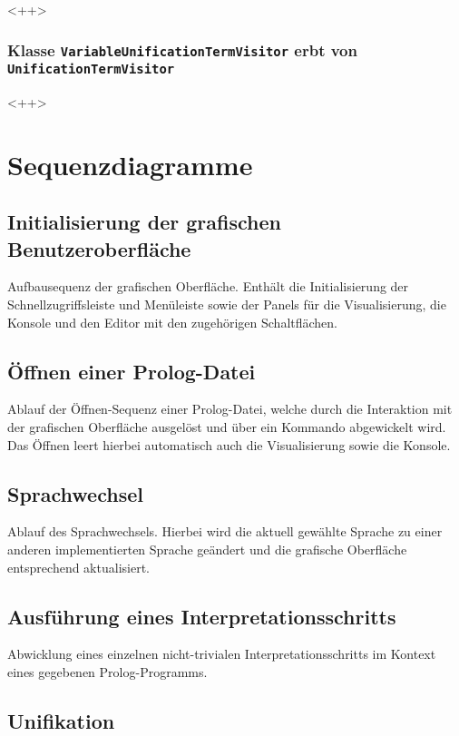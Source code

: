 \documentclass[parskip=full,11pt,twoside]{scrartcl}
\begin{document}
<++>

\subsubsection{Klasse \texttt{VariableUnificationTermVisitor} erbt von \texttt{UnificationTermVisitor}}

<++>

\section{Sequenzdiagramme}

\subsection{Initialisierung der grafischen Benutzeroberfläche}

Aufbausequenz der grafischen Oberfläche. Enthält die Initialisierung der Schnellzugriffsleiste und Menüleiste sowie der Panels für die Visualisierung, die Konsole und den Editor mit den zugehörigen Schaltflächen.

\subsection{Öffnen einer Prolog-Datei}

Ablauf der Öffnen-Sequenz einer Prolog-Datei, welche durch die Interaktion mit der grafischen Oberfläche ausgelöst und über ein Kommando abgewickelt wird. Das Öffnen leert hierbei automatisch auch die Visualisierung sowie die Konsole.

\subsection{Sprachwechsel}

Ablauf des Sprachwechsels. Hierbei wird die aktuell gewählte Sprache zu einer anderen implementierten Sprache geändert und die grafische Oberfläche entsprechend aktualisiert.

\subsection{Ausführung eines Interpretationsschritts}

Abwicklung eines einzelnen nicht-trivialen Interpretationsschritts im Kontext eines gegebenen Prolog-Programms.

\subsection{Unifikation}
\end{document}
